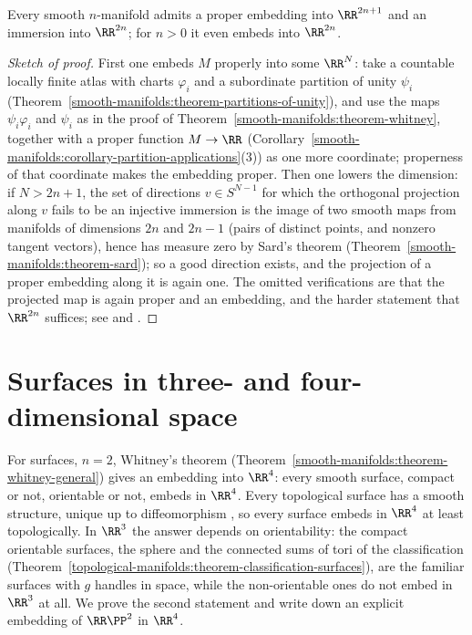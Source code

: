 \begin{theorem}[Whitney]\label{smooth-manifolds:theorem-whitney-general}
Every smooth $n$-manifold admits a proper embedding into $\RR^{2n+1}$ and an immersion into $\RR^{2n}$; for $n > 0$ it even embeds into $\RR^{2n}$.
\end{theorem}

\begin{proof}[Sketch of proof]
First one embeds $M$ properly into some $\RR^N$: take a countable locally finite atlas with charts $\varphi_i$ and a subordinate partition of unity $\psi_i$
(Theorem~\ref{smooth-manifolds:theorem-partitions-of-unity}), and use the maps $\psi_i\varphi_i$ and $\psi_i$ as in the proof of
Theorem~\ref{smooth-manifolds:theorem-whitney}, together with a proper function $M \to \RR$
(Corollary~\ref{smooth-manifolds:corollary-partition-applications}(3)) as one more coordinate; properness of that coordinate makes the embedding proper. Then one
lowers the dimension: if $N > 2n + 1$, the set of directions $v \in S^{N-1}$ for which the orthogonal projection along $v$ fails to be an injective immersion is
the image of two smooth maps from manifolds of dimensions $2n$ and $2n - 1$ (pairs of distinct points, and nonzero tangent vectors), hence has measure zero by
Sard's theorem (Theorem~\ref{smooth-manifolds:theorem-sard}); so a good direction exists, and the projection of a proper embedding along it is again one. The
omitted verifications are that the projected map is again proper and an embedding, and the harder statement that $\RR^{2n}$ suffices; see
\cite[Chapter 1]{hirsch-differential-topology} and \cite[Chapter 6]{lee-smooth-manifolds}.
\end{proof}

\section{Surfaces in three- and four-dimensional space}\label{smooth-manifolds:section-surfaces-embeddings}

For surfaces, $n = 2$, Whitney's theorem (Theorem~\ref{smooth-manifolds:theorem-whitney-general}) gives an embedding into $\RR^4$: every smooth surface, compact or not, orientable or not, embeds in $\RR^4$. Every
topological surface has a smooth structure, unique up to diffeomorphism \cite{moise-1977}, so every surface embeds in $\RR^4$ at least topologically. In $\RR^3$ the answer depends on orientability: the compact
orientable surfaces, the sphere and the connected sums of tori of the classification (Theorem~\ref{topological-manifolds:theorem-classification-surfaces}), are the familiar surfaces with $g$ handles in space, while the
non-orientable ones do not embed in $\RR^3$ at all. We prove the second statement and write down an explicit embedding of $\RR\PP^2$ in $\RR^4$.

